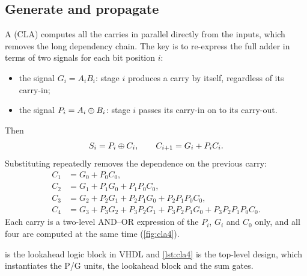 
\subsection{Generate and propagate}
A  (CLA) computes all the carries in parallel directly from the inputs, which removes the long dependency chain. The key is to re-express the full adder in terms of two signals for each bit position $i$:
\begin{itemize}
  \item the  signal $G_i = A_iB_i$: stage $i$ produces a carry by itself, regardless of its carry-in;
  \item the  signal $P_i = A_i\oplus B_i$: stage $i$ passes its carry-in on to its carry-out.
\end{itemize}
Then
\begin{equation}
  S_i = P_i\oplus C_i, \qquad C_{i+1} = G_i + P_iC_i .
  \label{eq:gp}
\end{equation}
Substituting repeatedly removes the dependence on the previous carry:
\begin{align*}
 C_1 &= G_0 + P_0C_0,\\
 C_2 &= G_1 + P_1G_0 + P_1P_0C_0,\\
 C_3 &= G_2 + P_2G_1 + P_2P_1G_0 + P_2P_1P_0C_0,\\
 C_4 &= G_3 + P_3G_2 + P_3P_2G_1 + P_3P_2P_1G_0 + P_3P_2P_1P_0C_0 .
\end{align*}
Each carry is a two-level AND--OR expression of the $P_i$, $G_i$ and $C_0$ only, and all four are computed at the same time (\cref{fig:cla4}).


 is the lookahead logic block in VHDL and \cref{lst:cla4} is the top-level design, which instantiates the P/G units, the lookahead block and the sum gates.



